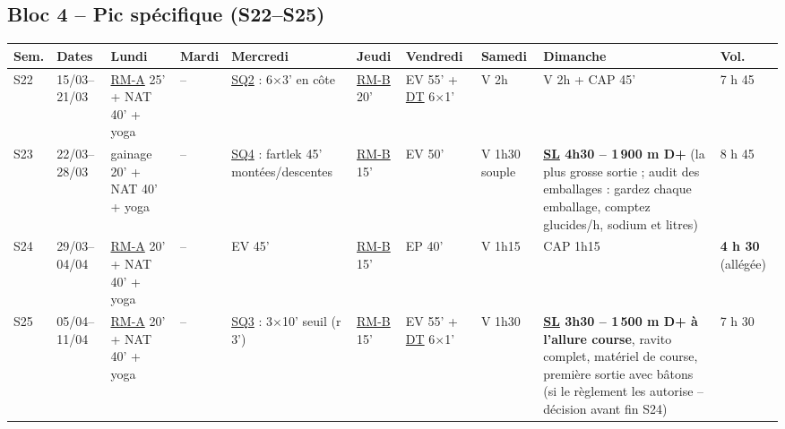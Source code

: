 \documentclass[10pt,a4paper]{article}
\newcommand{\rma}{\hyperlink{rm-a}{RM-A}}
\newcommand{\rmb}{\hyperlink{rm-b}{RM-B}}
\newcommand{\sqb}{\hyperlink{sq2}{SQ2}}
\newcommand{\sqc}{\hyperlink{sq3}{SQ3}}
\newcommand{\sqd}{\hyperlink{sq4}{SQ4}}
\newcommand{\dtl}{\hyperlink{dt}{DT}}
\newcommand{\sln}{\hyperlink{legende}{SL}}
\begin{document}
\begin{landscape}
\subsection*{\color{acc} Bloc 4 -- Pic sp\'ecifique (S22--S25)}
\begin{tabular}{p{0.95cm}p{1.5cm}p{2.95cm}p{1.3cm}p{3.7cm}p{1.5cm}p{3.5cm}p{2.2cm}p{3.9cm}p{1.15cm}}
\toprule
\textbf{Sem.} & \textbf{Dates} & \textbf{Lundi} & \textbf{Mardi} & \textbf{Mercredi} & \textbf{Jeudi} & \textbf{Vendredi} & \textbf{Samedi} & \textbf{Dimanche} & \textbf{Vol.}\\
\midrule
S22 & 15/03--21/03 & \rma{} 25' + NAT 40' + yoga & -- & \sqb{} : 6$\times$3' en c\^ote & \rmb{} 20' & EV 55' + \dtl{} 6$\times$1' & V 2h & V 2h + CAP 45' & 7 h 45\\
S23 & 22/03--28/03 & gainage 20' + NAT 40' + yoga & -- & \sqd{} : fartlek 45' mont\'ees/descentes & \rmb{} 15' & EV 50' & V 1h30 souple & \textbf{\sln{} 4h30 -- 1\,900 m D+} (la plus grosse sortie ; audit des emballages : gardez chaque emballage, comptez glucides/h, sodium et litres) & 8 h 45\\
S24 & 29/03--04/04 & \rma{} 20' + NAT 40' + yoga & -- & EV 45' & \rmb{} 15' & EP 40' & V 1h15 & CAP 1h15 & \textbf{4 h 30} (all\'eg\'ee)\\
S25 & 05/04--11/04 & \rma{} 20' + NAT 40' + yoga & -- & \sqc{} : 3$\times$10' seuil (r 3') & \rmb{} 15' & EV 55' + \dtl{} 6$\times$1' & V 1h30 & \textbf{\sln{} 3h30 -- 1\,500 m D+ \`a l'allure course}, ravito complet, mat\'eriel de course, premi\`ere sortie avec b\^atons (si le r\`eglement les autorise -- d\'ecision avant fin S24) & 7 h 30\\
\bottomrule
\end{tabular}
\medskip


\end{landscape}
\end{document}
